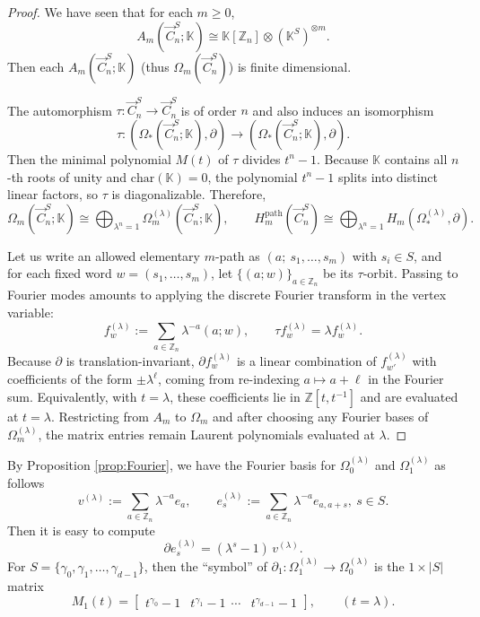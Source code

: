 \documentclass[11pt]{amsart}
\newcommand{\Z}{\mathbb Z}
\newcommand{\K}{\mathbb K}
\theoremstyle{plain}
\theoremstyle{definition}
\numberwithin{equation}{section}
\begin{document}
\begin{proof} We have seen that for each $m\geq0$,
\[A_m(\vec{C}_n^S;\K)\cong \K[\Z_n]\otimes(\K^S)^{\otimes m}.\]
Then each $A_m(\vec{C}_n^S;\K)$ (thus $\Omega_m(\vec{C}_n^S)$) is finite dimensional. 

The automorphism $\tau:\vec{C}_n^S\rightarrow\vec{C}_n^S$ is of order $n$ and also induces an isomorphism
\[\tau:\left(\Omega_*(\vec{C}_n^S;\K),\partial\right)\rightarrow\left(\Omega_*(\vec{C}_n^S;\K),\partial\right).\]
Then the minimal polynomial $M(t)$ of $\tau$ divides $t^n-1$. Because $\K$ contains all $n$-th roots of unity and $\mathrm{char}(\K) = 0$, the polynomial $t^n-1$ splits into distinct linear factors, so $\tau$ is diagonalizable. Therefore,
\[\Omega_m(\vec{C}_n^S;\K) \cong \bigoplus_{\lambda^n=1} \Omega_m^{(\lambda)}(\vec{C}_n^S;\K),\qquad H_m^{\mathrm{path}}(\vec{C}_n^S) \cong \bigoplus_{\lambda^n=1} H_m(\Omega_*^{(\lambda)},\partial).\]

Let us write an allowed elementary $m$-path as $(a; ~s_1,\dots,s_m)$ with $s_i\in S$, and for each fixed word $w=(s_1,\dots,s_m)$, let $\{(a;w)\}_{a\in\Z_n}$ be its $\tau$-orbit. Passing to Fourier modes amounts to applying the discrete Fourier transform in the vertex variable:
\[
f_w^{(\lambda)}:=\sum_{a\in\Z_n}\lambda^{-a}(a;w),
\qquad \tau f_w^{(\lambda)}=\lambda f_w^{(\lambda)}.
\]
Because $\partial$ is translation-invariant, $\partial f_w^{(\lambda)}$ is a linear combination of $f_{w'}^{(\lambda)}$ with coefficients of the form $\pm \lambda^{\ell}$,
coming from re-indexing $a\mapsto a+\ell$ in the Fourier sum. Equivalently, with $t=\lambda$, these coefficients lie in
$\mathbb{Z}[t,t^{-1}]$ and are evaluated at $t=\lambda$.
Restricting from $A_m$ to $\Omega_m$ and after choosing any Fourier bases of $\Omega_m^{(\lambda)}$, the matrix entries remain Laurent polynomials evaluated at $\lambda$.
\end{proof}

By Proposition \ref{prop:Fourier}, we have the Fourier basis for $\Omega_0^{(\lambda)}$ and $\Omega_1^{(\lambda)}$ as follows
\[
v^{(\lambda)}:=\sum_{a\in \Z_n}\lambda^{-a}e_a,\qquad 
e_s^{(\lambda)}:=\sum_{a\in \Z_n}\lambda^{-a}e_{a,a+s}, ~s\in S.
\]
Then it is easy to compute
\begin{equation}\label{eq:d1-symbol}
\partial e_s^{(\lambda)} = (\lambda^s-1)\,v^{(\lambda)}.
\end{equation}
For $S=\{\gamma_0,\gamma_1,\ldots,\gamma_{d-1}\}$, then the ``symbol'' of $\partial_1:\Omega_1^{(\lambda)}\to \Omega_0^{(\lambda)}$ is the $1\times |S|$ matrix
\[
M_1(t)=\begin{bmatrix} t^{\gamma_0}-1 & t^{\gamma_1}-1~~\cdots & t^{\gamma_{d-1}}-1\end{bmatrix},\qquad (t=\lambda).
\]
\end{document}
